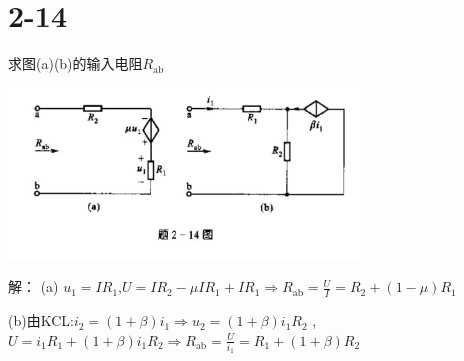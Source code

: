 \documentclass{article}
\begin{document}
\section*{2-14}
求图(a)(b)的输入电阻$R_\text{ab}$
\begin{center}
\includegraphics[width=0.7\textwidth,height=0.2\textheight]{2-14.jpg}
\end{center}
\noindent 解：
(a)
$u_1=IR_1$,$U=IR_2-\mu IR_1+IR_1
\Rightarrow R_\text{ab}=\frac{U}{I}
=R_2+(1-\mu)R_1$

(b)由KCL:$i_2=(1+\beta)i_1\Rightarrow u_2=(1+\beta)i_1R_2$
,$U=i_1R_1+(1+\beta)i_1R_2
\Rightarrow R_\text{ab}=\frac{U}{i_1}=R_1+(1+\beta)R_2$
\end{document}
